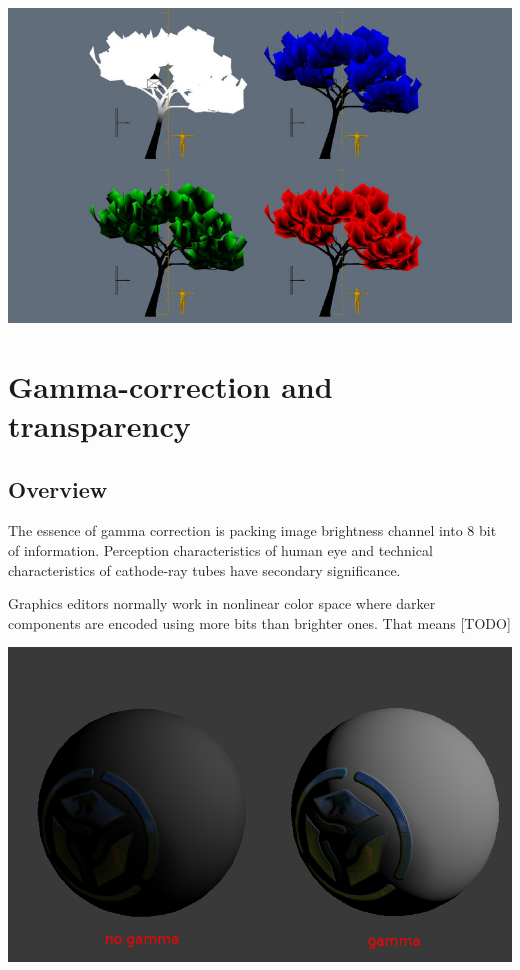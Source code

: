 \documentclass[a4paper,12pt,oneside]{sphinxmanual}
\begin{document}
{\hfill\includegraphics[width=1.000\linewidth]{wind_bending_vcolors.jpg}\hfill}


\chapter{Gamma-correction and transparency}
\label{gamma_alpha::doc}\label{gamma_alpha:gamma}\label{gamma_alpha:id1}

\section{Overview}
\label{gamma_alpha:id2}
The essence of gamma correction is packing image brightness channel into 8 bit of information. Perception characteristics of human eye and technical characteristics of cathode-ray tubes have secondary significance.

Graphics editors normally work in nonlinear color space where darker components are encoded using more bits than brighter ones. That means {[}TODO{]}

{\hfill\includegraphics[width=1.000\linewidth]{gamma.jpg}\hfill}
\end{document}
